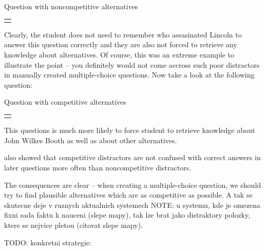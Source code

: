 \documentclass[a4paper, 12pt, twoside]{fithesis2}		%
\renewcommand{\_}{\leavevmode \kern0.0em\vbox{\hrule width0.4em}}
\newcounter{choice}
\renewcommand\thechoice{\Alph{choice}}
\newcommand\choicelabel{\thechoice.}
\newenvironment{choices}%
  {\vspace{0.2em}\list{\choicelabel}%
     {\usecounter{choice}\def\makelabel##1{\hss\llap{##1}}%
       \settowidth{\leftmargin}{W.\hskip\labelsep\hskip 0.01em}%
       \def\choice{%
         \item
       } %
       \labelwidth\leftmargin\advance\labelwidth-\labelsep
       \topsep=0pt
       \partopsep=0pt
     }%
  }%
  {\vspace{-0.7em}\endlist}
\newenvironment{question}
{
  \begin{center}
  \begin{tabular}{p{0.9\textwidth}}
  \vskip 0.05em
}
{
  \\
  \end{tabular}
  \end{center}
}
\newcommand{\sentenceGap}{\rule{1.5cm}{0.4pt}~}
\begin{document}
\begin{exercise}
\caption{Question with noncompetitive alternatives}%
  \begin{question}
  Lincoln was assassinated by \sentenceGap , a Confederate sympathizer.
  \begin{choices}
    \choice Emancipation Proclamation
    \choice John Wilkes Booth
    \choice Illinois
    \choice Department of Agriculture
  \end{choices}
  \end{question}
\end{exercise}

Clearly, the student does not need to remember who assasinated Lincoln to answer this question correctly and they are also not forced to retrieve any knowledge about alternatives.
Of course, this was an extreme example to illustrate the point -- you definitely would not come accross such poor distractors in manually created multiple-choice questions.
Now take a look at the following question:

\begin{exercise}
\caption{Question with competitive alternatives}%
  \begin{question}
  Lincoln was assassinated by \sentenceGap , a Confederate sympathizer.
  \begin{choices}
    \choice Thomas N. Conrad
    \choice Robert E. Lee
    \choice John Wilkes Booth
    \choice Ward Hill Lamon
  \end{choices}
  \end{question}
\end{exercise}

This questions is much more likely to force student to retrieve knowledge about John Wilkes Booth as well as about other alternatives.

\cite{optimizing-multiple-choice} also showed that competitive distractors are not confused with correct answers in later questions more often than noncompetitive distractors.

The consequences are clear -- when creating a multiple-choice question, we should try to find plausible alternatives which are as competitive as possible.
A tak se skutecne deje v ruznych aktualnich systemech \cite{question-gen-mitkov, slepe-mapy}
NOTE: u systemu, kde je omezena fixni sada faktu k nauceni (slepe mapy), tak lze brat jako distraktory polozky, ktere se nejvice pletou (citovat slepe mapy).

TODO: konkretni strategie:
\end{document}
